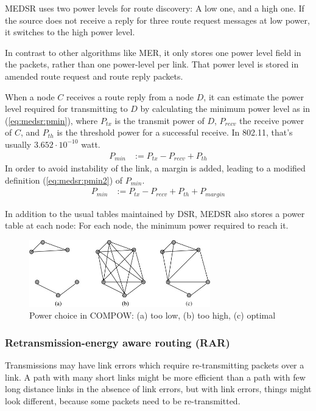 MEDSR uses two power levels for route discovery: A low one, and a high one. If
the source does not receive a reply for three route request messages at low
power, it switches to the high power level.

In contrast to other algorithms like MER, it only stores one power level field
in the packets, rather than one power-level per link. That power level is stored
in amended route request and route reply packets.

When a node $C$ receives a route reply from a node $D$, it can estimate the
power level required for transmitting to $D$ by calculating the minimum power
level as in (\ref{eq:medsr:pmin}), where $P_{tx}$ is the transmit power of $D$, $P_{recv}$ the receive power of $C$,
and $P_{th}$ is the threshold power for a successful receive. In 802.11, that's
usually $3.652 \cdot 10^{-10}$ watt.
\begin{align}
  \label{eq:medsr:pmin}
   P_{min} &:= P_{tx} - P_{recv} + P_{th} 
\end{align}
In order to avoid instability of the link, a margin is added,
leading to a modified definition (\ref{eq:medsr:pmin2}) of $P_{min}$.
\begin{align}
  \label{eq:medsr:pmin2}
   P_{min} &:= P_{tx} - P_{recv} + P_{th} + P_{margin}
\end{align}

In addition to the usual tables maintained by DSR, MEDSR also stores a power
table at each node: For each node, the minimum power required to reach it.



\begin{figure}
\centering
\includegraphics[width=0.7\textwidth]{images/compow-level-choice}
\caption{Power choice in COMPOW: (a) too low, (b) too high, (c) optimal}
\label{compow:power-choice}
\end{figure}

\subsubsection{Retransmission-energy aware routing (RAR)}
Transmissions may have link errors which require re-transmitting packets over
a link. A path with many short links might be more efficient than a path with
few long distance links in the absence of link errors, but with link errors,
things might look different, because some packets need to be re-transmitted.

